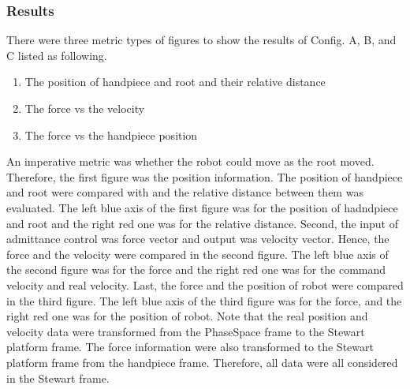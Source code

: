 \subsubsection{Results}
\hspace*{6mm} There were three metric types of figures to show the results of Config. A, B, and C listed as following.
\begin{enumerate}
	\item The position of handpiece and root and their relative distance
	\item The force vs the velocity
	\item The force vs the handpiece position
\end{enumerate}
\hspace*{6mm}An imperative metric was whether the robot could move as the root moved. Therefore, the first figure was the position information. The position of handpiece and root were compared with and the relative distance between them was evaluated. The left blue axis of the first figure was for the position of hadndpiece and root and the right red one was for the relative distance. Second, the input of admittance control was force vector and output was velocity vector. Hence, the force and the velocity were compared in the second figure. The left blue axis of the second figure was for the force and the right red one was for the command velocity and real velocity. Last, the force and the position of robot were compared in the third figure. The left blue axis of the third figure was for the force, and the right red one was for the position of robot. Note that the real position and velocity data were transformed from the PhaseSpace frame to the Stewart platform frame. The force information were also transformed to the Stewart platform frame from the handpiece frame. Therefore, all data were all considered in the Stewart frame.
